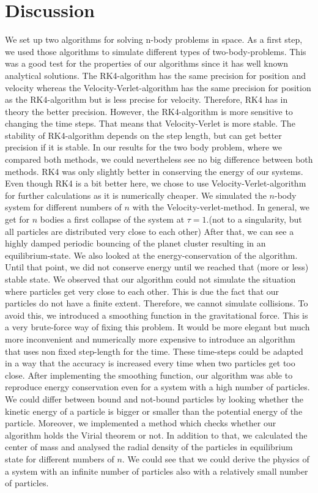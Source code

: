 \documentclass[10pt,a4paper]{article}
\begin{document}
\clearpage
\section{Discussion}

We set up two algorithms for solving n-body problems in space. As a first step, we used those algorithms to simulate different types of two-body-problems. This was a good test for the properties of our algorithms since it has well known analytical solutions. 
The RK4-algorithm has the same precision for position and velocity whereas the Velocity-Verlet-algorithm has the same precision for position as the RK4-algorithm but is less precise for velocity. Therefore, RK4 has in theory the better precision. However, the RK4-algorithm is more sensitive to changing the time steps. That means that Velocity-Verlet is more stable. The stability of RK4-algorithm depends on the step length, but can get better precision if it is stable. In our results for the two body problem, where we compared both methods, we could nevertheless see no big difference between both methods. RK4 was only slightly better in conserving the energy of our systems.
Even though RK4 is a bit better here, we chose to use Velocity-Verlet-algorithm for further calculations as it is numerically cheaper. 
We simulated the $n$-body system for different numbers of $n$ with the Velocity-verlet-method. 
In general, we get for $n$ bodies a first collapse of the system at $\tau=1$.(not to a singularity, but all particles are distributed very close to each other) After that, we can see a highly damped periodic bouncing of the planet cluster resulting in an equilibrium-state. We also looked at the energy-conservation of the algorithm. Until that point, we did not conserve energy until we reached that (more or less) stable state.
We observed that our algorithm could not simulate the situation where particles get very close to each other. This is due the fact that our particles do not have a finite extent. Therefore, we cannot simulate collisions. To avoid this, we introduced a smoothing function in the gravitational force. This is a very brute-force way of fixing this problem. It would be more elegant but much more inconvenient and numerically more expensive to introduce an algorithm that uses non fixed step-length for the time. These time-steps could be adapted in a way that the accuracy is increased every time when two particles get too close.
After implementing the smoothing function, our algorithm was able to reproduce energy conservation even for a system with a high number of particles.
We could differ between bound and not-bound particles by looking whether the kinetic energy of a particle is bigger or smaller than the potential energy of the particle. Moreover, we implemented a method which checks whether our algorithm holds the Virial theorem or not. 
In addition to that, we calculated the center of mass and analysed the radial density of the particles in equilibrium state for different numbers of $n$. We could see that we could derive the physics of a system with an infinite number of particles also with a relatively small number of particles.
\end{document}
